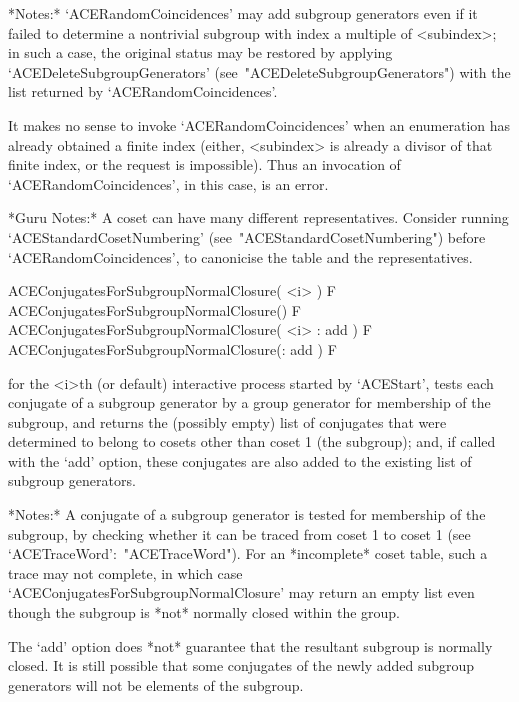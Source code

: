 *Notes:* 
`ACERandomCoincidences' may add subgroup generators even if it  failed
to  determine  a  nontrivial  subgroup  with  index  a   multiple   of
<subindex>; in such a case, the original status  may  be  restored  by
applying                                 `ACEDeleteSubgroupGenerators'
(see~"ACEDeleteSubgroupGenerators")  with   the   list   returned   by
`ACERandomCoincidences'.

It  makes  no  sense  to  invoke   `ACERandomCoincidences'   when   an
enumeration has already obtained a finite index (either, <subindex> is
already a divisor of that finite index, or the request is impossible).
Thus an invocation of `ACERandomCoincidences', in  this  case,  is  an
error.

*Guru  Notes:*  A  coset  can  have  many  different  representatives.
Consider              running              `ACEStandardCosetNumbering'
(see~"ACEStandardCosetNumbering") before  `ACERandomCoincidences',  to
canonicise the table and the representatives.

\>ACEConjugatesForSubgroupNormalClosure( <i> ) F
\>ACEConjugatesForSubgroupNormalClosure() F
\>ACEConjugatesForSubgroupNormalClosure( <i> : add ) F
\>ACEConjugatesForSubgroupNormalClosure(: add ) F

for the <i>th (or  default)  interactive  {\ACE}  process  started  by
`ACEStart', tests each conjugate of a subgroup generator  by  a  group
generator for membership of the subgroup, and  returns  the  (possibly
empty) list of conjugates that were determined  to  belong  to  cosets
other than coset 1 (the subgroup);  and,  if  called  with  the  `add'
option, these conjugates are  also  added  to  the  existing  list  of
subgroup generators.

*Notes:* A conjugate of a subgroup generator is tested for  membership
of the subgroup, by checking whether it can be traced from coset 1  to
coset 1  (see  `ACETraceWord':~"ACETraceWord").  For  an  *incomplete*
coset  table,  such  a  trace  may  not  complete,   in   which   case
`ACEConjugatesForSubgroupNormalClosure' may return an empty list  even
though the subgroup is *not* normally closed within the group.

The `add' option does *not* guarantee that the resultant  subgroup  is
normally closed. It is still possible  that  some  conjugates  of  the
newly added subgroup generators will not be elements of the subgroup.

\enditems

